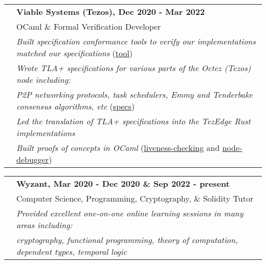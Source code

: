 \documentclass[letterpaper,10pt,oneside]{article}
\begin{document}
\noindent \begin{tabular}{@{} l l}
 \hspace{1.1in} & \textbf{Viable Systems (Tezos), Dec 2020 - Mar 2022} \\
 & OCaml \& Formal Verification Developer \\
 & \emph{Built specification conformance tools to verify our implementations matched our specifications} (\href{https://github.com/Isaac-DeFrain?tab=repositories&q=&type=&language=tla&sort=}{tool}) \\
 & \emph{Wrote TLA+ specifications for various parts of the Octez (Tezos) node including:} \\
 & \emph{P2P networking protocols, task schedulers, Emmy and Tenderbake consensus algorithms, etc} (\href{https://github.com/tezedge/tezedge-specification}{specs}) \\
 & \emph{Led the translation of TLA+ specifications into the TezEdge Rust implementations} \\
 & \emph{Built proofs of concepts in OCaml} (\href{https://github.com/Isaac-DeFrain/liveness-checking}{liveness-checking} and \href{https://github.com/Isaac-DeFrain/node-debugger}{node-debugger}) \\
\end{tabular}

\vfill



\noindent \begin{tabular}{@{} l l}
 \hspace{1.1in} & \textbf{Wyzant, Mar 2020 - Dec 2020 \& Sep 2022 - present} \\
 & Computer Science, Programming, Cryptography, \& Solidity Tutor \\
 & \emph{Provided excellent one-on-one online learning sessions in many areas including:} \\
 & \emph{cryptography, functional programming, theory of computation, dependent types, temporal logic} \\
\end{tabular}
\end{document}

